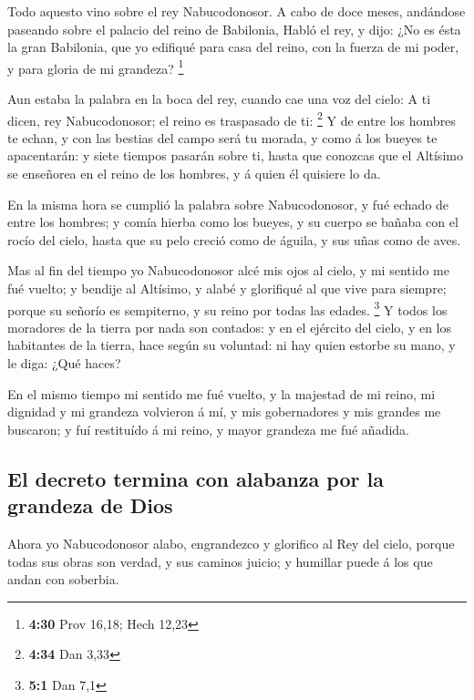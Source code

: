  Todo aquesto vino sobre el rey Nabucodonosor.
 A cabo de doce meses, andándose paseando sobre el palacio
del reino de Babilonia,  Habló el rey, y dijo: ¿No es ésta
la gran Babilonia, que yo edifiqué para casa del reino, con la fuerza de
mi poder, y para gloria de mi grandeza? \footnote{\textbf{4:30} Prov
  16,18; Hech 12,23}

 Aun estaba la palabra en la boca del rey, cuando cae una
voz del cielo: A ti dicen, rey Nabucodonosor; el reino es traspasado de
ti: \footnote{\textbf{4:34} Dan 3,33}  Y de entre los
hombres te echan, y con las bestias del campo será tu morada, y como á
los bueyes te apacentarán: y siete tiempos pasarán sobre ti, hasta que
conozcas que el Altísimo se enseñorea en el reino de los hombres, y á
quien él quisiere lo da.

 En la misma hora se cumplió la palabra sobre
Nabucodonosor, y fué echado de entre los hombres; y comía hierba como
los bueyes, y su cuerpo se bañaba con el rocío del cielo, hasta que su
pelo creció como de águila, y sus uñas como de aves.

 Mas al fin del tiempo yo Nabucodonosor alcé mis ojos al
cielo, y mi sentido me fué vuelto; y bendije al Altísimo, y alabé y
glorifiqué al que vive para siempre; porque su señorío es sempiterno, y
su reino por todas las edades. \footnote{\textbf{5:1} Dan 7,1}
 Y todos los moradores de la tierra por nada son contados:
y en el ejército del cielo, y en los habitantes de la tierra, hace según
su voluntad: ni hay quien estorbe su mano, y le diga: ¿Qué haces?

 En el mismo tiempo mi sentido me fué vuelto, y la majestad
de mi reino, mi dignidad y mi grandeza volvieron á mí, y mis
gobernadores y mis grandes me buscaron; y fuí restituído á mi reino, y
mayor grandeza me fué añadida.

\hypertarget{el-decreto-termina-con-alabanza-por-la-grandeza-de-dios}{%
\subsection{El decreto termina con alabanza por la grandeza de
Dios}\label{el-decreto-termina-con-alabanza-por-la-grandeza-de-dios}}

 Ahora yo Nabucodonosor alabo, engrandezco y glorifico al
Rey del cielo, porque todas sus obras son verdad, y sus caminos juicio;
y humillar puede á los que andan con soberbia.

